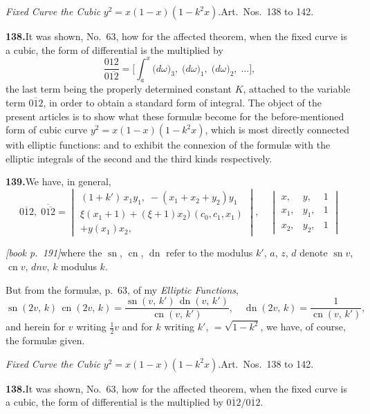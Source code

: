 \documentclass[11pt,a4paper]{article}
\DeclareMathOperator{\sn}{sn}
\DeclareMathOperator{\cn}{cn}
\DeclareMathOperator{\dn}{dn}
\begin{document}
\medskip\noindent\textit{Fixed Curve the Cubic} $y^2 = x(1 - x)(1 - k^2 x)$.\quad Art.\ Nos.\ 138 to 142.

\medskip\noindent\textbf{138.}\quad It was shown, No.\ 63, how for the affected theorem, when the fixed curve is a cubic, the form of differential is the multiplied by
\[
\frac{012}{0\overline{12}} = \bigl[\!\int_a^x\bigl(d\omega\bigr)_3\!,\;\bigl(d\omega\bigr)_1\!,\;\bigl(d\omega\bigr)_2\!,\;\ldots\bigr],
\]
the last term being the properly determined constant $K$, attached to the variable term $\overline{012}$, in order to obtain a standard form of integral. The object of the present articles is to show what these formul\ae{} become for the before-mentioned form of cubic curve $y^2 = x(1 - x)(1 - k^2 x)$, which is most directly connected with elliptic functions: and to exhibit the connexion of the formul\ae{} with the elliptic integrals of the second and the third kinds respectively.

\medskip\noindent\textbf{139.}\quad We have, in general,
\[
\overline{012},\;\overline{0\overline{12}} = \begin{vmatrix}
(1 + k')\,x_1y_1,\;-(x_1 + x_2 + y_2)y_1\\
\xi(x_1 + 1) + (\xi + 1)x_2)\,(c_0, c_1, x_1)\\
+ y(x_1)x_2,
\end{vmatrix},\quad\begin{vmatrix} x, & y, & 1\\ x_1, & y_1, & 1\\ x_2, & y_2, & 1 \end{vmatrix}
\]

\medskip\noindent\textit{[book p.~191]}\quad where the $\sn$, $\cn$, $\dn$ refer to the modulus $k'$, $a$, $z$, $d$ denote $\sn v$, $\cn v$, $dn v$, $k$ modulus $k$.

But from the formul\ae{}, p.\ $63$, of my \textit{Elliptic Functions},
\[
\sn(2v,\,k)\,\cn(2v,\,k) = \frac{\sn(v,\,k')\,\dn(v,\,k')}{\cn(v,\,k')},\quad \dn(2v,\,k) = \frac{1}{\cn(v,\,k')},
\]
and herein for $v$ writing $\tfrac{1}{2}v$ and for $k$ writing $k'$, $= \sqrt{1 - k^2}$, we have, of course, the formul\ae{} given.

\medskip\noindent\textit{Fixed Curve the Cubic} $y^2 = x(1 - x)(1 - k^2 x)$.\quad Art.\ Nos.\ 138 to 142.

\medskip\noindent\textbf{138.}\quad It was shown, No.\ 63, how for the affected theorem, when the fixed curve is a cubic, the form of differential is the multiplied by $\overline{012}/\overline{012}$.
\end{document}
